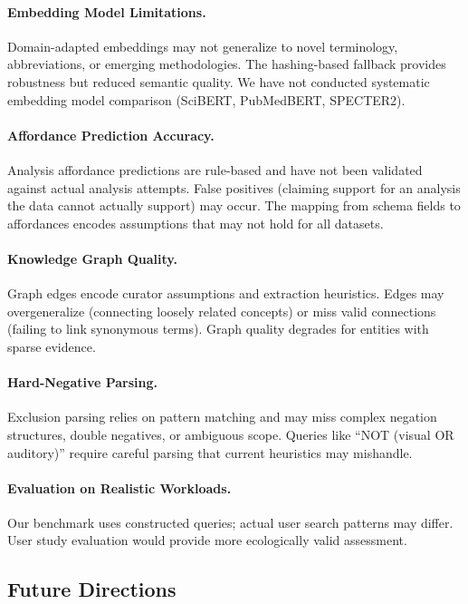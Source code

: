 \documentclass{article}
\theoremstyle{definition}
\begin{document}
\paragraph{Embedding Model Limitations.} Domain-adapted embeddings may not generalize to novel terminology, abbreviations, or emerging methodologies. The hashing-based fallback provides robustness but reduced semantic quality. We have not conducted systematic embedding model comparison (SciBERT, PubMedBERT, SPECTER2).

\paragraph{Affordance Prediction Accuracy.} Analysis affordance predictions are rule-based and have not been validated against actual analysis attempts. False positives (claiming support for an analysis the data cannot actually support) may occur. The mapping from schema fields to affordances encodes assumptions that may not hold for all datasets.

\paragraph{Knowledge Graph Quality.} Graph edges encode curator assumptions and extraction heuristics. Edges may overgeneralize (connecting loosely related concepts) or miss valid connections (failing to link synonymous terms). Graph quality degrades for entities with sparse evidence.

\paragraph{Hard-Negative Parsing.} Exclusion parsing relies on pattern matching and may miss complex negation structures, double negatives, or ambiguous scope. Queries like ``NOT (visual OR auditory)'' require careful parsing that current heuristics may mishandle.

\paragraph{Evaluation on Realistic Workloads.} Our benchmark uses constructed queries; actual user search patterns may differ. User study evaluation would provide more ecologically valid assessment.

\subsection{Future Directions}
\end{document}
